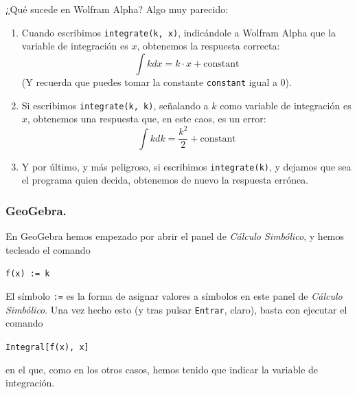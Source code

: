 \documentclass[10pt,a4paper]{article}\usepackage[]{graphicx}\usepackage[]{color}
\begin{document}
¿Qué sucede en Wolfram Alpha? Algo muy parecido:
\begin{enumerate}
  \item Cuando escribimos {\tt integrate(k, x)}, indicándole a Wolfram Alpha que la variable de integración es $x$, obtenemos la respuesta correcta:
      \[\int k dx= k\cdot x+\mbox{constant}\]
      (Y recuerda que puedes tomar la constante {\tt constant} igual a 0).

  \item Si escribimos {\tt integrate(k, k)}, señalando a $k$ como variable de integración es $x$, obtenemos una respuesta que, en este caos, es un error:
      \[\int k dk= \dfrac{k^2}{2}+\mbox{constant}\]

  \item Y por último, y más peligroso, si escribimos {\tt integrate(k)}, y dejamos que sea el programa quien decida, obtenemos de nuevo la respuesta errónea.
\end{enumerate}

\subsubsection*{GeoGebra.}

En GeoGebra hemos empezado por abrir el panel de {\em Cálculo Simbólico}, y hemos tecleado el comando
\begin{center}
  \verb#f(x) := k#
\end{center}
El símbolo {\tt :=} es la forma de asignar valores a símbolos en este panel de {\em Cálculo Simbólico}. Una vez hecho esto (y tras pulsar {\tt Entrar}, claro), basta con ejecutar el comando
\begin{center}
  \verb#Integral[f(x), x]#
\end{center}
en el que, como en los otros casos, hemos tenido que indicar la variable de integración.
\end{document}
